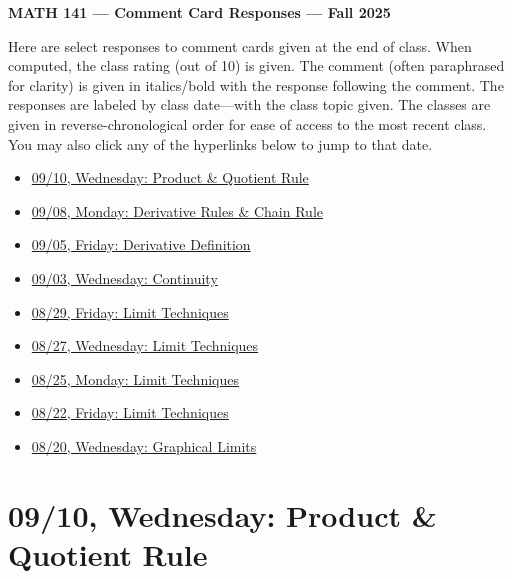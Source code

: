 \documentclass[11pt,letterpaper]{article}
\begin{document}
\begin{center} {\bfseries \LARGE MATH 141 --- Comment Card Responses --- Fall 2025} \end{center}

Here are select responses to comment cards given at the end of class. When computed, the class rating (out of 10) is given. The comment (often paraphrased for clarity) is given in italics/bold with the response following the comment. The responses are labeled by class date---with the class topic given. The classes are given in reverse-chronological order for ease of access to the most recent class. You may also click any of the hyperlinks below to jump to that date.

\begin{itemize}
\item \hyperref[09-10]{09/10, Wednesday: Product \& Quotient Rule}
\item \hyperref[09-08]{09/08, Monday: Derivative Rules \& Chain Rule}
\item \hyperref[09-05]{09/05, Friday: Derivative Definition}
\item \hyperref[09-03]{09/03, Wednesday: Continuity}
\item \hyperref[08-29]{08/29, Friday: Limit Techniques}
\item \hyperref[08-27]{08/27, Wednesday: Limit Techniques}
\item \hyperref[08-25]{08/25, Monday: Limit Techniques}
\item \hyperref[08-22]{08/22, Friday: Limit Techniques}
\item \hyperref[08-20]{08/20, Wednesday: Graphical Limits}
\end{itemize}

\newpage
\section*{09/10, Wednesday: Product \& Quotient Rule\label{09-10}}
\end{document}
